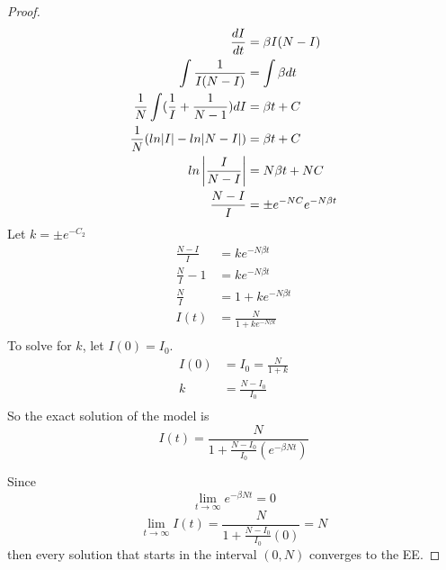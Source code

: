 \begin{proof}
\begin{align*}
    \frac{dI}{dt}                                   &= \beta I(N-I)\\
    \int\frac{1}{I(N-I)}                            &= \int\beta dt\\
    \frac{1}{N}\int (\frac{1}{I} + \frac{1}{N-1})dI &= \beta t + C\\
    \frac{1}{N}(ln|I|- ln|N-I|)                     &= \beta t + C\\
    ln\left|\frac{I}{N-I}\right|                           &= N \beta t + NC\\
    \frac{N-I}{I}                                   &= \pm e^{-NC}e^{-N\beta t}\\
\end{align*}
Let $k = \pm e^{-C_2}$\\
\begin{align*}
    \frac{N-I}{I} 	  &= ke^{-N\beta t}\\
    \frac{N}{I} - 1   &= ke^{-N\beta t}\\
    \frac{N}{I} 	  &= 1 + ke^{-N\beta t}\\
    I(t) 			  &= \frac{N}{1 + ke^{-N\beta t}}\\
\end{align*}
To solve for $k$, let $I(0) = I_0$.\\
\begin{align*}
    I(0) 	&= I_0 = \frac{N}{1 + k}\\
    k 		&= \frac{N - I_0}{I_0}\\
\end{align*}
So the exact solution of the model is
\begin{equation}
  I(t) =  \frac{N}{1+\frac{N-I_0}{I_0}(e^{-\beta N t})}
\end{equation}

Since
$$\lim_{t\to\infty} e^{-\beta N t} = 0$$
$$\lim_{t\to\infty} I(t) = \frac{N}{1 +\frac{N-I_0}{I_0}(0)} = N$$
then every solution that starts in the interval $(0, N)$ converges to the EE.
\end{proof}

